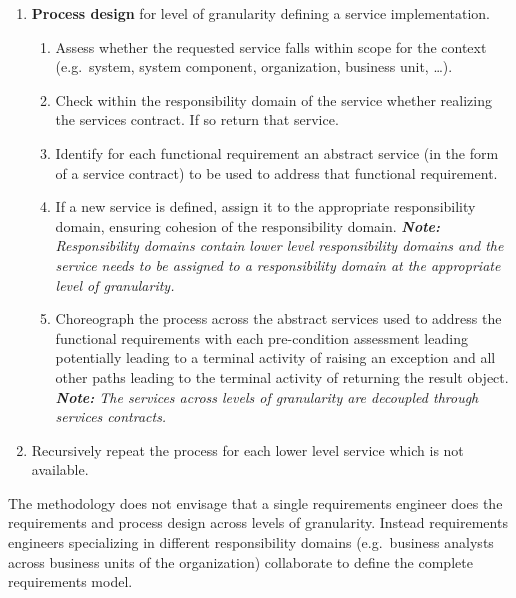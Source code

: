 \begin{enumerate}
 \item {\bf Process design} for level of granularity defining a service implementation.
      \begin{enumerate}
	\item Assess whether the requested service falls within scope for the context (e.g.\ system, system component, organization, business unit, \dots).
	\item Check within the responsibility domain of the service whether realizing the services contract. If so return that service.
        \item Identify for each functional requirement an abstract service (in the form of a service contract) to be used to address that functional requirement.
	\item If a new service is defined, assign it to the appropriate responsibility domain, ensuring cohesion of the responsibility domain. \emph{\textbf{\textit{Note:}} Responsibility domains contain lower level responsibility domains and the service needs to be assigned to a responsibility domain at the appropriate level of granularity.}
	\item Choreograph the process across the abstract services used to address the functional requirements with each pre-condition assessment leading potentially leading to a terminal activity of raising an exception and all other paths leading to the terminal activity of returning the result object. \emph{\textbf{\textit{Note:}} The services across levels of granularity are decoupled through services contracts.}
      \end{enumerate}

  \item Recursively repeat the process for each lower level service which is not available.
\end{enumerate}


The methodology does not envisage that a single requirements engineer does the requirements and process design across levels of granularity. Instead requirements engineers specializing in different responsibility domains (e.g.\ business analysts across business units of the organization) collaborate to define the complete requirements model.
